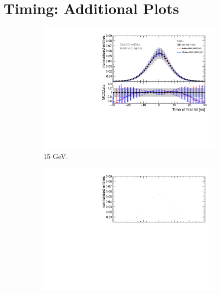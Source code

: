 \chapter{Timing: Additional Plots}
\label{appendix:TimingAdd}

\begin{figure}[htbp!]
  \begin{subfigure}[t]{0.5\textwidth}
    \centering
    \includegraphics[width=1\textwidth]{../Thesis_Plots/Timing/Electrons/Plots/Comparison_SimData_Electrons15GeV.pdf}
    \caption{15 GeV.}\label{fig:elec_sim_data_15GeV}
  \end{subfigure}
  \hfill
  \begin{subfigure}[t]{0.5\textwidth}
    \centering
    \includegraphics[width=1\textwidth]{../Thesis_Plots/Timing/Electrons/Plots/Comparison_SimData_Electrons20GeV.pdf}

\end{subfigure}
\end{figure}
